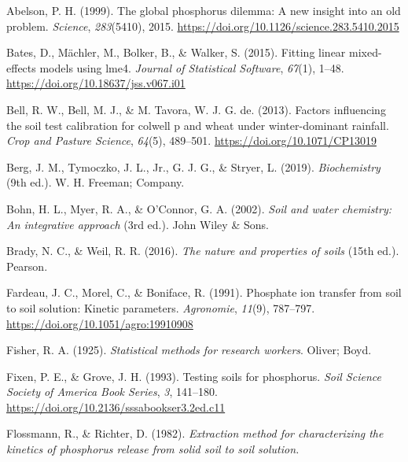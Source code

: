 \documentclass[
  a4paper,
]{article}
\newlength{\cslhangindent}
\newenvironment{CSLReferences}[2] %
 {\begin{list}{}{%
  \setlength{\itemindent}{0pt}
  \setlength{\leftmargin}{0pt}
  \setlength{\parsep}{0pt}
  \ifodd #1
   \setlength{\leftmargin}{\cslhangindent}
   \setlength{\itemindent}{-1\cslhangindent}
  \fi
  \setlength{\itemsep}{#2\baselineskip}}}
 {\end{list}}
\begin{document}
\label{refs}
\begin{CSLReferences}{1}{0}
Abelson, P. H. (1999). The global phosphorus dilemma: A new insight into
an old problem. \emph{Science}, \emph{283}(5410), 2015.
\url{https://doi.org/10.1126/science.283.5410.2015}

Bates, D., Mächler, M., Bolker, B., \& Walker, S. (2015). Fitting linear
mixed-effects models using {lme4}. \emph{Journal of Statistical
Software}, \emph{67}(1), 1--48.
\url{https://doi.org/10.18637/jss.v067.i01}

Bell, R. W., Bell, M. J., \& M. Tavora, W. J. G. de. (2013). Factors
influencing the soil test calibration for colwell p and wheat under
winter-dominant rainfall. \emph{Crop and Pasture Science}, \emph{64}(5),
489--501. \url{https://doi.org/10.1071/CP13019}

Berg, J. M., Tymoczko, J. L., Jr., G. J. G., \& Stryer, L. (2019).
\emph{Biochemistry} (9th ed.). W. H. Freeman; Company.

Bohn, H. L., Myer, R. A., \& O'Connor, G. A. (2002). \emph{Soil and
water chemistry: An integrative approach} (3rd ed.). John Wiley \& Sons.

Brady, N. C., \& Weil, R. R. (2016). \emph{The nature and properties of
soils} (15th ed.). Pearson.

Fardeau, J. C., Morel, C., \& Boniface, R. (1991). Phosphate ion
transfer from soil to soil solution: Kinetic parameters.
\emph{Agronomie}, \emph{11}(9), 787--797.
\url{https://doi.org/10.1051/agro:19910908}

Fisher, R. A. (1925). \emph{Statistical methods for research workers}.
Oliver; Boyd.

Fixen, P. E., \& Grove, J. H. (1993). Testing soils for phosphorus.
\emph{Soil Science Society of America Book Series}, \emph{3}, 141--180.
\url{https://doi.org/10.2136/sssabookser3.2ed.c11}

Flossmann, R., \& Richter, D. (1982). \emph{Extraction method for
characterizing the kinetics of phosphorus release from solid soil to
soil solution.}


\end{CSLReferences}
\end{document}
